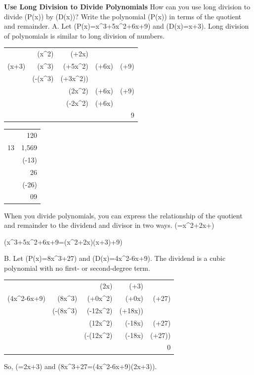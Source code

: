 \documentclass{article}
\newenvironment{example}[1]{}{}         %
\newcommand{\answer}[1]{}               %
\newcommand{\te}[1]{}                   %
\begin{document}
\begin{example}{1}
\textbf{Use Long Division to Divide Polynomials}
How can you use long division to divide (P(x)) by (D(x))? Write the polynomial (P(x)) in terms of the quotient and remainder.
A. Let (P(x)=x^3+5x^2+6x+9) and (D(x)=x+3).
Long division of polynomials is similar to long division of numbers.
\begin{tabular}{r|rrrr}
 & (x^2) & (+2x) & & \\
(x+3) & (x^3) & (+5x^2) & (+6x) & (+9) \\
 & (-(x^3) & (+3x^2)) & & \\
\cline{2-5}
 & & (2x^2) & (+6x) & (+9) \\
 & & (-2x^2) & (+6x) & \\
\cline{3-5}
 & & & & 9 \\
\end{tabular}
\te{Printed second subtraction row is (-2x^2+6x), without parentheses; likely (-(2x^2+6x)). Callout: Divide the leading terms: (x^3\div x=x^2). Write above the 2nd term to keep like terms together.}
\te{LOOK FOR RELATIONSHIPS Compare the long division of these two polynomials to this numerical long division problem.}
\begin{tabular}{r|r}
 & 120 \\
13 & 1,569 \\
 & (-13) \\
\cline{2-2}
 & 26 \\
 & (-26) \\
\cline{2-2}
 & 09 \\
\end{tabular}
When you divide polynomials, you can express the relationship of the quotient and remainder to the dividend and divisor in two ways.
(=x^2+2x+)
\te{Callout: (\frac{\text{dividend}}{\text{divisor}}=\text{quotient}+\frac{\text{remainder}}{\text{divisor}}).}
(x^3+5x^2+6x+9=(x^2+2x)(x+3)+9)
\te{Callout: dividend = quotient (\times) divisor + remainder. CONTINUED ON THE NEXT PAGE.}
\answer{A. (x^3+5x^2+6x+9=(x^2+2x)(x+3)+9)}
B. Let (P(x)=8x^3+27) and (D(x)=4x^2-6x+9).
The dividend is a cubic polynomial with no first- or second-degree term.
\begin{tabular}{r|rrrr}
 & & (2x) & (+3) & \\
(4x^2-6x+9) & (8x^3) & (+0x^2) & (+0x) & (+27) \\
 & (-(8x^3) & (-12x^2) & (+18x)) & \\
\cline{2-5}
 & & (12x^2) & (-18x) & (+27) \\
 & & (-(12x^2) & (-18x) & (+27)) \\
\cline{3-5}
 & & & & 0 \\
\end{tabular}
\te{Callouts: Use 0 as the coefficient for the missing 1st- and 2nd-degree terms. The remainder is 0. This means (4x^2-6x+9) is a factor of (8x^3+27). GENERALIZE When the remainder is 0, you can use the results of the long division to write P(x) in factored form.}
So, (=2x+3) and (8x^3+27=(4x^2-6x+9)(2x+3)).
\answer{B. (8x^3+27=(4x^2-6x+9)(2x+3))}
\end{example}
\end{document}
